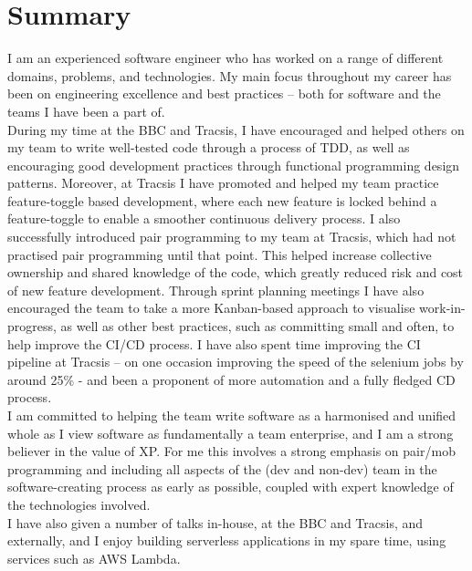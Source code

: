 \section{Summary}

I am an experienced software engineer who has worked on a range of different domains, problems, and technologies. My main focus throughout my career has been on engineering excellence and best practices – both for software and the teams I have been a part of.\\

During my time at the BBC and Tracsis, I have encouraged and helped others on my team to write well-tested code through a process of TDD, as well as encouraging good development practices through functional programming design patterns. Moreover, at Tracsis I have promoted and helped my team practice feature-toggle based development, where each new feature is locked behind a feature-toggle to enable a smoother continuous delivery process. I also successfully introduced pair programming to my team at Tracsis, which had not practised pair programming until that point. This helped increase collective ownership and shared knowledge of the code, which greatly reduced risk and cost of new feature development. Through sprint planning meetings I have also encouraged the team to take a more Kanban-based approach to visualise work-in-progress, as well as other best practices, such as committing small and often, to help improve the CI/CD process. I have also spent time improving the CI pipeline at Tracsis – on one occasion improving the speed of the selenium jobs by around 25\% - and been a proponent of more automation and a fully fledged CD process.\\

I am committed to helping the team write software as a harmonised and unified whole as I view software as fundamentally a team enterprise, and I am a strong believer in the value of XP. For me this involves a strong emphasis on pair/mob programming and including all aspects of the (dev and non-dev) team in the software-creating process as early as possible, coupled with expert knowledge of the technologies involved.\\

I have also given a number of talks in-house, at the BBC and Tracsis, and externally, and I enjoy building serverless applications in my spare time, using services such as AWS Lambda.\\
